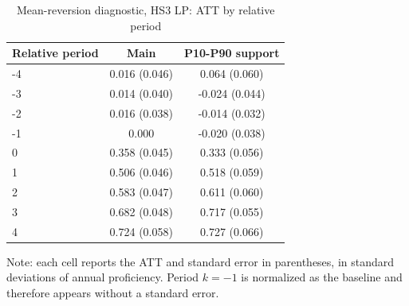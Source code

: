 ﻿\begin{table}[!htbp]
\centering
\caption{Mean-reversion diagnostic, HS3 LP: ATT by relative period}
\label{tab:ap_event_regmedia_HS3_lp}
\vspace{-0.15cm}
\scriptsize
\setlength{\tabcolsep}{4pt}
\renewcommand{\arraystretch}{0.92}
\begin{tabular}{lcc}
\toprule
Relative period & Main & P10-P90 support \\
\midrule
-4 & 0.016 (0.046) & 0.064 (0.060) \\
-3 & 0.014 (0.040) & -0.024 (0.044) \\
-2 & 0.016 (0.038) & -0.014 (0.032) \\
-1 & 0.000 & -0.020 (0.038) \\
0 & 0.358 (0.045) & 0.333 (0.056) \\
1 & 0.506 (0.046) & 0.518 (0.059) \\
2 & 0.583 (0.047) & 0.611 (0.060) \\
3 & 0.682 (0.048) & 0.717 (0.055) \\
4 & 0.724 (0.058) & 0.727 (0.066) \\
\bottomrule
\end{tabular}
\begin{flushleft}
\footnotesize Note: each cell reports the ATT and standard error in parentheses, in standard deviations of annual proficiency. Period \(k=-1\) is normalized as the baseline and therefore appears without a standard error.
\end{flushleft}
\end{table}



